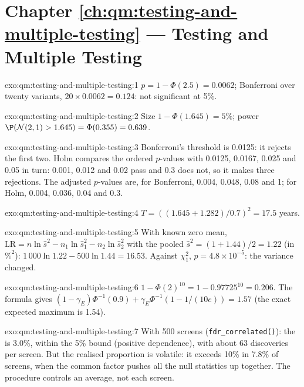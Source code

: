 \section*{Chapter \ref{ch:qm:testing-and-multiple-testing} --- Testing and Multiple Testing}

\begin{solution}{exo:qm:testing-and-multiple-testing:1}
$p = 1 - \Phi(2.5) = 0.0062$; Bonferroni over twenty variants, $20 \times 0.0062 = 0.124$: not significant at 5\%.
\end{solution}

\begin{solution}{exo:qm:testing-and-multiple-testing:2}
Size $1 - \Phi(1.645) = 5\%$; power $\P(\mathcal N(2, 1) > 1.645) = \Phi(0.355) = 0.639$.
\end{solution}

\begin{solution}{exo:qm:testing-and-multiple-testing:3}
Bonferroni's threshold is 0.0125: it rejects the first two. Holm compares the ordered $p$-values with 0.0125, 0.0167, 0.025 and
0.05 in turn: 0.001, 0.012 and 0.02 pass and 0.3 does not, so it makes three rejections. The adjusted $p$-values are, for
Bonferroni, 0.004, 0.048, 0.08 and 1; for Holm, 0.004, 0.036, 0.04 and 0.3.
\end{solution}

\begin{solution}{exo:qm:testing-and-multiple-testing:4}
$T = ((1.645 + 1.282)/0.7)^2 = 17.5$ years.
\end{solution}

\begin{solution}{exo:qm:testing-and-multiple-testing:5}
With known zero mean, $\mathrm{LR} = n\ln\hat s^2 - n_1\ln\hat s_1^2 - n_2\ln\hat s_2^2$ with the pooled $\hat s^2 = (1 + 1.44)/2 = 1.22$ (in
$\%^2$): $1\,000\ln1.22 - 500\ln1.44 = 16.53$. Against $\chi^2_1$, $p = 4.8 \times 10^{-5}$: the variance changed.
\end{solution}

\begin{solution}{exo:qm:testing-and-multiple-testing:6}
$1 - \Phi(2)^{10} = 1 - 0.97725^{10} = 0.206$. The formula gives $(1 - \gamma_E)\Phi^{-1}(0.9) + \gamma_E\Phi^{-1}(1 - 1/(10e)) = 1.57$
(the exact expected maximum is 1.54).
\end{solution}

\begin{solution}{exo:qm:testing-and-multiple-testing:7}
With 500 screens (\texttt{fdr\_correlated()}): the  is 3.0\%, within the 5\% bound (positive dependence), with
about 63 discoveries per screen. But the realised proportion is volatile: it exceeds 10\% in 7.8\% of screens, when the common
factor pushes all the null statistics up together. The procedure controls an average, not each screen.
\end{solution}

